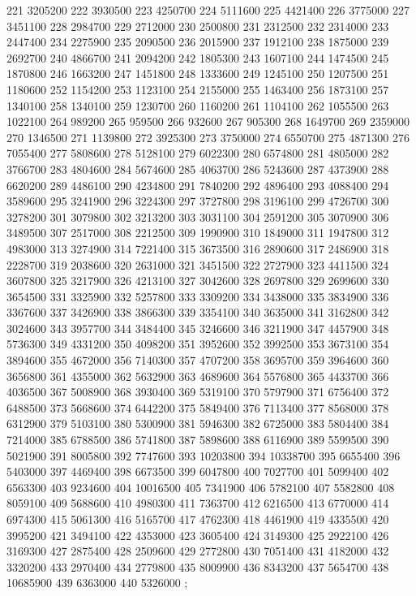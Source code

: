 {221 3205200
222 3930500
223 4250700
224 5111600
225 4421400
226 3775000
227 3451100
228 2984700
229 2712000
230 2500800
231 2312500
232 2314000
233 2447400
234 2275900
235 2090500
236 2015900
237 1912100
238 1875000
239 2692700
240 4866700
241 2094200
242 1805300
243 1607100
244 1474500
245 1870800
246 1663200
247 1451800
248 1333600
249 1245100
250 1207500
251 1180600
252 1154200
253 1123100
254 2155000
255 1463400
256 1873100
257 1340100
258 1340100
259 1230700
260 1160200
261 1104100
262 1055500
263 1022100
264 989200
265 959500
266 932600
267 905300
268 1649700
269 2359000
270 1346500
271 1139800
272 3925300
273 3750000
274 6550700
275 4871300
276 7055400
277 5808600
278 5128100
279 6022300
280 6574800
281 4805000
282 3766700
283 4804600
284 5674600
285 4063700
286 5243600
287 4373900
288 6620200
289 4486100
290 4234800
291 7840200
292 4896400
293 4088400
294 3589600
295 3241900
296 3224300
297 3727800
298 3196100
299 4726700
300 3278200
301 3079800
302 3213200
303 3031100
304 2591200
305 3070900
306 3489500
307 2517000
308 2212500
309 1990900
310 1849000
311 1947800
312 4983000
313 3274900
314 7221400
315 3673500
316 2890600
317 2486900
318 2228700
319 2038600
320 2631000
321 3451500
322 2727900
323 4411500
324 3607800
325 3217900
326 4213100
327 3042600
328 2697800
329 2699600
330 3654500
331 3325900
332 5257800
333 3309200
334 3438000
335 3834900
336 3367600
337 3426900
338 3866300
339 3354100
340 3635000
341 3162800
342 3024600
343 3957700
344 3484400
345 3246600
346 3211900
347 4457900
348 5736300
349 4331200
350 4098200
351 3952600
352 3992500
353 3673100
354 3894600
355 4672000
356 7140300
357 4707200
358 3695700
359 3964600
360 3656800
361 4355000
362 5632900
363 4689600
364 5576800
365 4433700
366 4036500
367 5008900
368 3930400
369 5319100
370 5797900
371 6756400
372 6488500
373 5668600
374 6442200
375 5849400
376 7113400
377 8568000
378 6312900
379 5103100
380 5300900
381 5946300
382 6725000
383 5804400
384 7214000
385 6788500
386 5741800
387 5898600
388 6116900
389 5599500
390 5021900
391 8005800
392 7747600
393 10203800
394 10338700
395 6655400
396 5403000
397 4469400
398 6673500
399 6047800
400 7027700
401 5099400
402 6563300
403 9234600
404 10016500
405 7341900
406 5782100
407 5582800
408 8059100
409 5688600
410 4980300
411 7363700
412 6216500
413 6770000
414 6974300
415 5061300
416 5165700
417 4762300
418 4461900
419 4335500
420 3995200
421 3494100
422 4353000
423 3605400
424 3149300
425 2922100
426 3169300
427 2875400
428 2509600
429 2772800
430 7051400
431 4182000
432 3320200
433 2970400
434 2779800
435 8009900
436 8343200
437 5654700
438 10685900
439 6363000
440 5326000
};
